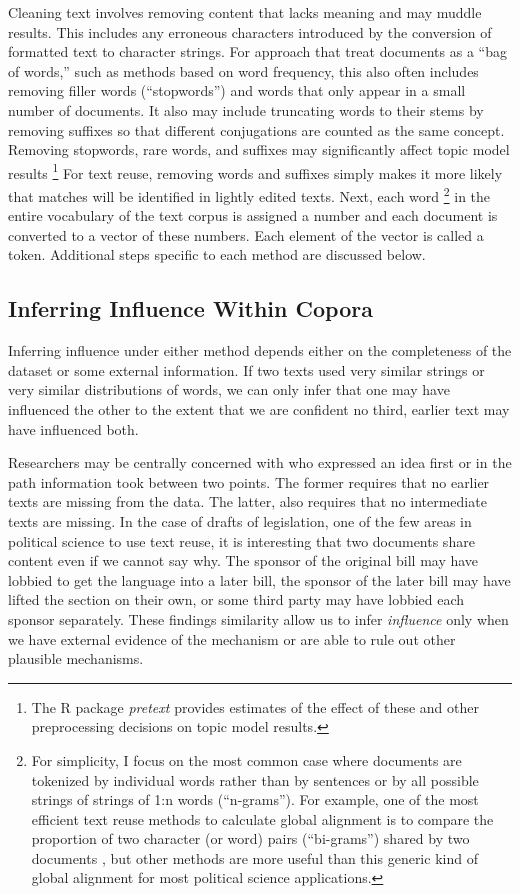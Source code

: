 \documentclass{article}
\begin{document}
Cleaning text involves removing content that lacks meaning and may muddle results. This includes any erroneous characters introduced by the conversion of formatted text to character strings. For approach that treat documents as a ``bag of words,'' such as methods based on word frequency, this also often includes removing filler words (``stopwords'') and words that only appear in a small number of documents. It also may include truncating words to their stems by removing suffixes so that different conjugations are counted as the same concept. Removing stopwords, rare words, and suffixes may significantly affect topic model results \citep{Fokkens2013}\footnote{The R package \textit{pretext} \citep{Denny2017} provides estimates of the effect of these and other preprocessing decisions on topic model results.} For text reuse, removing words and suffixes simply makes it more likely that matches will be identified in lightly edited texts. Next, each word \footnote{For simplicity, I focus on the most common case where documents are tokenized by individual words rather than by sentences or by all possible strings of strings of 1:n words (``n-grams''). For example, one of the most efficient text reuse methods to calculate global alignment is to compare the proportion of two character (or word) pairs (``bi-grams'') shared by two documents \citep{Dice1945}, but other methods are more useful than this generic kind of global alignment for most political science applications.} in the entire vocabulary of the text corpus is assigned a number and each document is converted to a vector of these numbers. Each element of the vector is called a token. 
Additional steps specific to each method are discussed below. %


\subsection{Inferring Influence Within Copora}
Inferring influence under either method depends either on the completeness of the dataset or some external information. If two texts used very similar strings or very similar distributions of words, we can only infer that  one may have influenced the other to the extent that we are confident no third, earlier text may have influenced both.

Researchers may be centrally concerned with who expressed an idea first or in the path information took between two points. The former requires that no earlier texts are missing from the data. The latter, also requires that no intermediate texts are missing. In the case of drafts of legislation, one of the few areas in political science to use text reuse, it is interesting that two documents share content even if we cannot say why. The sponsor of the original bill may have lobbied to get the language into a later bill, the sponsor of the later bill may have lifted the section on their own, or some third party may have lobbied each sponsor separately. These findings similarity allow us to infer \textit{influence} only when we have external evidence of the mechanism or are able to rule out other plausible mechanisms. 
\end{document}
